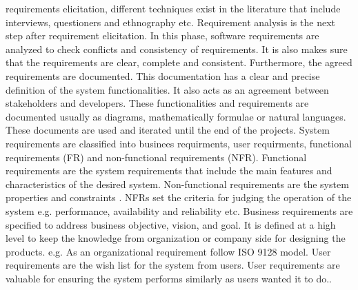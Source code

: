 requirements elicitation, different techniques exist in the literature that
include interviews, questioners and ethnography etc.
Requirement analysis \cite{Nuseibeh:2000:RER:336512.336523} is the next step
after requirement elicitation. In this phase, software requirements are analyzed
to check conflicts and consistency of requirements. It is also makes sure that
the requirements are clear, complete and consistent. Furthermore, the agreed
requirements are documented. This documentation has a clear and precise
definition of the system functionalities. It also acts as an agreement between
stakeholders and developers. These functionalities and requirements are
documented usually as diagrams, mathematically formulae or natural languages.
These documents are used and iterated until the end of the projects.
System requirements are classified into businees requirments, user requirments,
functional requirements (FR) and non-functional requirements (NFR). Functional
requirements are the system requirements that include the main features and
characteristics of the desired system. Non-functional requirements are the
system properties and constraints \cite{Davis:1993:SRO:113586}. NFRs set the
criteria for judging the operation of the system e.g.
performance, availability and reliability etc. Business requirements are specified to address business objective, 
vision, and goal. It is defined at a high level to keep the knowledge from organization or company side for 
designing the products. e.g. As an organizational requirement follow ISO 9128 model. User requirements are 
the wish list for the system from users. User requirements are valuable for ensuring the system performs similarly as users wanted it to do..
